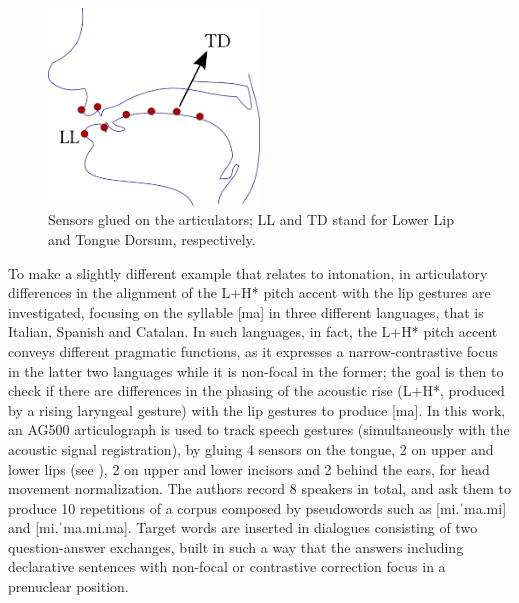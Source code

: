 \documentclass[output=paper]{langsci/langscibook}
\begin{document}
\begin{figure}[b]
\includegraphics[width=0.5\textwidth]{figures/GIL-img1.png}
\caption{Sensors glued on the articulators; LL and TD stand for Lower Lip and Tongue Dorsum, respectively.}
\label{fig:gil:1} 
\end{figure}
 
 
To make a slightly different example that relates to intonation, in \citet{Stella2014} articulatory differences in the alignment of the L+H* pitch accent with the lip gestures are investigated, focusing on the syllable [ma] in three different languages, that is Italian, Spanish and Catalan. In such languages, in fact, the L+H* pitch accent conveys different pragmatic functions, as it expresses a narrow-contrastive focus in the latter two languages while it is non-focal in the former; the goal is then to check if there are differences in the phasing of the acoustic rise (L+H*, produced by a rising laryngeal gesture) with the lip gestures to produce [ma]. In this work, an AG500 articulograph is used to track speech gestures (simultaneously with the acoustic signal registration), by gluing 4 sensors on the tongue, 2 on upper and lower lips (see ), 2 on upper and lower incisors and 2 behind the ears, for head movement normalization. The authors record 8 speakers in total, and ask them to produce 10 repetitions of a corpus composed by pseudowords such as [mi.ˈma.mi] and [mi.ˈma.mi.ma]. Target words are inserted in dialogues consisting of two question-answer exchanges, built in such a way that the answers including declarative sentences with non-focal or contrastive correction focus in a prenuclear position. 
\end{document}
